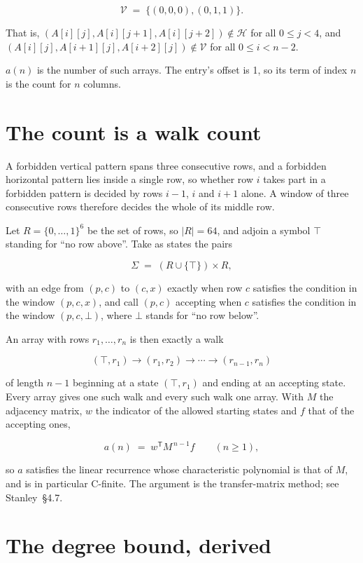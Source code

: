 \documentclass[11pt]{article}
\theoremstyle{definition}
\begin{document}
\[\mathcal{V} \;=\; \{(0,0,0), (0,1,1)\}.\]

That is, $(A[i][j],A[i][j{+}1],A[i][j{+}2]) \notin \mathcal{H}$ for all $0 \le j < 4$, and $(A[i][j],A[i{+}1][j],A[i{+}2][j]) \notin \mathcal{V}$ for all $0 \le i < n-2$.

$a(n)$ is the number of such arrays. The entry's offset is 1, so its term of index $n$ is the count for $n$ columns.

\section{The count is a walk count}

A forbidden vertical pattern spans three consecutive rows, and a forbidden horizontal pattern lies inside a single row, so whether row $i$ takes part in a forbidden pattern is decided by rows $i-1$, $i$ and $i+1$ alone. A window of three consecutive rows therefore decides the whole of its middle row.

Let $R = \{0,\dots,1\}^{6}$ be the set of rows, so $|R| = 64$, and adjoin a symbol $\top$ standing for ``no row above''. Take as states the pairs

\[\Sigma \;=\; (R \cup \{\top\}) \times R,\]

with an edge from $(p,c)$ to $(c,x)$ exactly when row $c$ satisfies the condition in the window $(p,c,x)$, and call $(p,c)$ accepting when $c$ satisfies the condition in the window $(p,c,\bot)$, where $\bot$ stands for ``no row below''.

An array with rows $r_1,\dots,r_n$ is then exactly a walk

\[(\top,r_1) \to (r_1,r_2) \to \cdots \to (r_{n-1},r_n)\]

of length $n-1$ beginning at a state $(\top,r_1)$ and ending at an accepting state. Every array gives one such walk and every such walk one array. With $M$ the adjacency matrix, $w$ the indicator of the allowed starting states and $f$ that of the accepting ones,

\[a(n) \;=\; w^{\mathsf T} M^{\,n-1} f \qquad (n \ge 1),\]

so $a$ satisfies the linear recurrence whose characteristic polynomial is that of $M$, and is in particular C-finite. The argument is the transfer-matrix method; see Stanley~\S4.7.

\section{The degree bound, derived}
\end{document}
